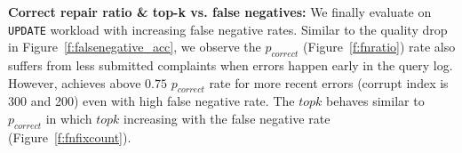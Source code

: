 \textbf{Correct repair ratio \& top-k vs. false negatives: } We finally evaluate \sys on \texttt{UPDATE} workload with increasing false negative rates. Similar to the quality drop in Figure~\ref{f:falsenegative_acc}, we observe the $p_{correct}$ (Figure~\ref{f:fnratio}) rate also suffers from less submitted complaints when errors happen early in the query log. However, \sys achieves above $0.75$ $p_{correct}$ rate for more recent errors (corrupt index is 300 and 200) even with high false negative rate. The $topk$ behaves similar to $p_{correct}$ in which $topk$ increasing with the false negative rate (Figure~\ref{f:fnfixcount}).  